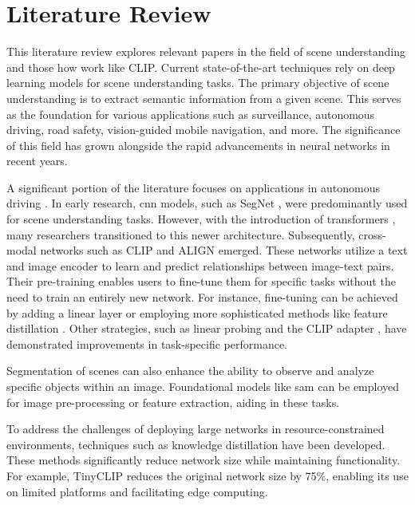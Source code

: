\chapter{Literature Review}

This literature review explores relevant papers in the field of scene understanding and those how work like CLIP.  
Current state-of-the-art techniques rely on deep learning models for scene understanding tasks.  
The primary objective of scene understanding is to extract semantic information from a given scene.  
This serves as the foundation for various applications such as surveillance, autonomous driving, road safety, vision-guided mobile navigation, and more.  
The significance of this field has grown alongside the rapid advancements in neural networks in recent years.  

A significant portion of the literature focuses on applications in autonomous driving \cite{sceneunderstandingautdriving1}.  
In early research, \acrfull{cnn} models, such as SegNet \cite{SegNet}, were predominantly used for scene understanding tasks.  
However, with the introduction of transformers \cite{attentionisallyouneed}, many researchers transitioned to this newer architecture.  
Subsequently, cross-modal networks such as CLIP \cite{clip} and ALIGN \cite{ALIGN} emerged.  
These networks utilize a text and image encoder to learn and predict relationships between image-text pairs.  
Their pre-training enables users to fine-tune them for specific tasks without the need to train an entirely new network.  
For instance, fine-tuning can be achieved by adding a linear layer or employing more sophisticated methods like feature distillation \cite{finetuneclip}.  
Other strategies, such as linear probing \cite{linearprobeclip} and the CLIP adapter \cite{clipadapter}, have demonstrated improvements in task-specific performance.  

Segmentation of scenes can also enhance the ability to observe and analyze specific objects within an image.  
Foundational models like \acrfull{sam} \cite{sam} can be employed for image pre-processing or feature extraction, aiding in these tasks.  

To address the challenges of deploying large networks in resource-constrained environments, techniques such as knowledge distillation have been developed.  
These methods significantly reduce network size while maintaining functionality.  
For example, TinyCLIP \cite{tinyclip} reduces the original network size by 75\%, enabling its use on limited platforms and facilitating edge computing.  

